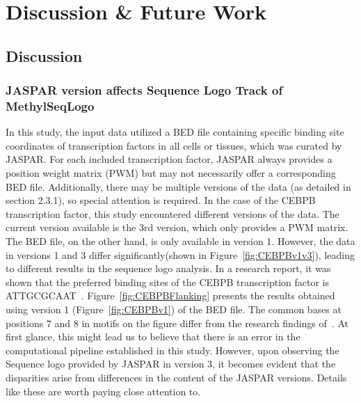 \documentclass{PHlab-thesis}
\begin{document}
\chapter{Discussion \& Future Work}
\section{Discussion}
\subsection{JASPAR version affects Sequence Logo Track of MethylSeqLogo}
In this study, the input data utilized a BED file containing specific binding site coordinates of transcription factors in all cells or tissues, which was curated by JASPAR. For each included transcription factor, JASPAR always provides a position weight matrix (PWM) but may not necessarily offer a corresponding BED file. Additionally, there may be multiple versions of the data (as detailed in section 2.3.1), so special attention is required. In the case of the CEBPB transcription factor, this study encountered different versions of the data. The current version available is the 3rd version, which only provides a PWM matrix. The BED file, on the other hand, is only available in version 1. However, the data in versions 1 and 3 differ significantly(shown in Figure~\ref{fig:CEBPBv1v3}), leading to different results in the sequence logo analysis. In a research report, it was shown that the preferred binding sites of the CEBPB transcription factor is ATTGCGCAAT~\cite{johnson1993identification}. Figure~\ref{fig:CEBPBFlanking} presents the results obtained using version 1 (Figure~\ref{fig:CEBPBv1}) of the BED file. The common bases at positions 7 and 8 in motifs on the figure differ from the research findings of~\cite{johnson1993identification}. At first glance, this might lead us to believe that there is an error in the computational pipeline established in this study. However, upon observing the Sequence logo provided by JASPAR in version 3, it becomes evident that the disparities arise from differences in the content of the JASPAR versions. Details like these are worth paying close attention to.
\
\end{document}
